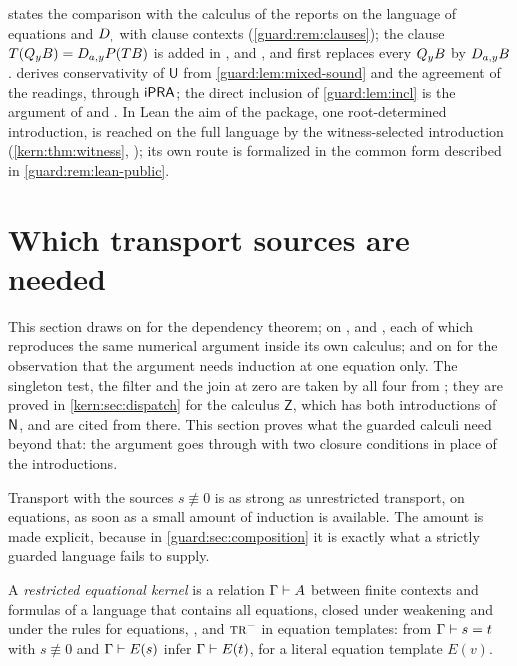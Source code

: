 \begin{remark}[Versions]
\label{guard:rem:core-versions}
 states the comparison with the calculus of the reports
on the language of equations and $D_{,}$ with clause contexts
(\cref{guard:rem:clauses}); the clause $T(Q_{y}B)=D_{a,y}P(TB)$ is added in
,  and
, and  first replaces every
$Q_{y}B$ by $D_{a,y}B$.   derives conservativity of
$\mathsf U$ from \cref{guard:lem:mixed-sound} and the agreement of the
readings, through $\mathsf{iPRA}$; the direct inclusion of \cref{guard:lem:incl} is
the argument of  and .  In Lean the
aim of the package, one root-determined introduction, is reached on the
full language by the witness-selected introduction
(\cref{kern:thm:witness}, ); its own route is formalized in the common form
described in \cref{guard:rem:lean-public}.
\end{remark}

\section{Which transport sources are needed}
\label{guard:sec:sources}

This section draws on  for the dependency theorem; on
,  and ,
each of which reproduces the same numerical argument inside its own
calculus; and on  for the observation that the argument
needs induction at one equation only.  The singleton test, the filter and
the join at zero are taken by all four from ; they
are proved in \cref{kern:sec:dispatch} for the calculus $\mathsf Z$, which
has both introductions of $\mathsf{N}$, and are cited from there.  This section
proves what the guarded calculi need beyond that: the argument goes through
with two closure conditions in place of the introductions.

Transport with the sources $s\not\equiv 0$ is as strong as unrestricted
transport, on equations, as soon as a small amount of induction is
available.  The amount is made explicit, because in
\cref{guard:sec:composition} it is exactly what a strictly guarded language
fails to supply.

\begin{definition}
\label{guard:def:rek}
A \emph{restricted equational kernel} is a relation $\Gamma\vdash A$
between finite contexts and formulas of a language that contains all
equations, closed under weakening and under the rules  for
equations, ,  and $\rulename{Tr}^{-}$ in equation
templates: from
$\Gamma\vdash s=t$ with $s\not\equiv 0$ and $\Gamma\vdash E(s)$ infer
$\Gamma\vdash E(t)$, for a literal equation template $E(v)$.
\end{definition}

